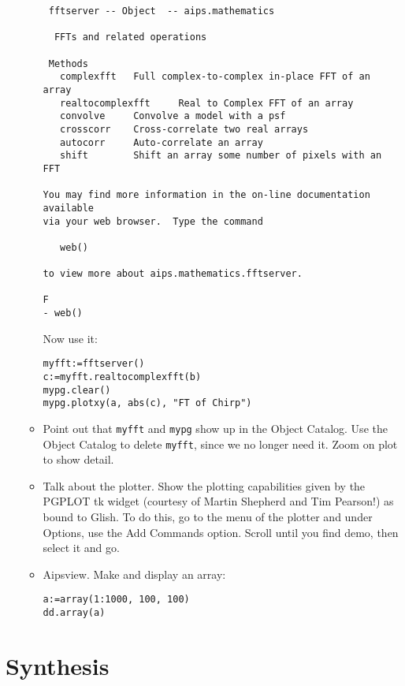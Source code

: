 \begin{itemize}
\begin{itemize}
\begin{verbatim}
 fftserver -- Object  -- aips.mathematics

  FFTs and related operations

 Methods
   complexfft   Full complex-to-complex in-place FFT of an array
   realtocomplexfft     Real to Complex FFT of an array
   convolve     Convolve a model with a psf
   crosscorr    Cross-correlate two real arrays
   autocorr     Auto-correlate an array
   shift        Shift an array some number of pixels with an FFT

You may find more information in the on-line documentation available
via your web browser.  Type the command

   web()

to view more about aips.mathematics.fftserver.

F 
- web()
\end{verbatim}
Now use it:
\begin{verbatim}
myfft:=fftserver()
c:=myfft.realtocomplexfft(b)
mypg.clear()
mypg.plotxy(a, abs(c), "FT of Chirp")
\end{verbatim}
\item Point out that {\tt myfft} and {\tt mypg} show up in the Object
Catalog. Use the Object Catalog to delete {\tt myfft}, since we no longer
need it.
Zoom on plot to show detail.
\item Talk about the plotter. Show the plotting capabilities given by the
PGPLOT tk widget (courtesy of Martin Shepherd and Tim Pearson!)
as bound to Glish. To do this, go to the menu of the plotter and
under Options, use the Add Commands option. Scroll until you find
demo, then select it and go.
\item Aipsview. Make and display an array:
\begin{verbatim}
a:=array(1:1000, 100, 100)
dd.array(a)
\end{verbatim}
\end{itemize}
\end{itemize}


\section{Synthesis}

